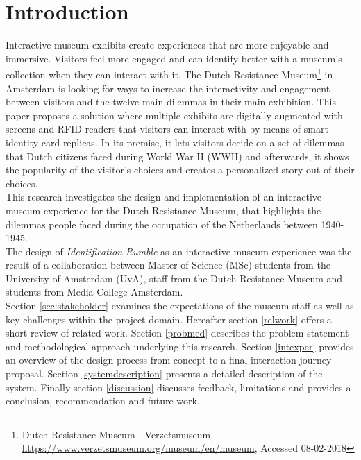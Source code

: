
\section{Introduction}
Interactive museum exhibits create experiences that are more enjoyable and immersive. Visitors feel more engaged and can identify better with a museum's collection when they can interact with it. The Dutch Resistance Museum\footnote{Dutch Resistance Museum - Verzetsmuseum, \url{https://www.verzetsmuseum.org/museum/en/museum}, Accessed 08-02-2018} in Amsterdam is looking for ways to increase the interactivity and engagement between visitors and the twelve main dilemmas in their main exhibition. This paper proposes a solution where multiple exhibits are digitally augmented with screens and RFID readers that visitors can interact with by means of smart identity card replicas. In its premise, it lets visitors decide on a set of dilemmas that Dutch citizens faced during World War II (WWII) and afterwards, it shows the popularity of the visitor's choices and creates a personalized story out of their choices.\\

\noindent This research investigates the design and implementation of an interactive museum experience for the Dutch Resistance Museum, that highlights the dilemmas people faced during the occupation of the Netherlands between 1940-1945.\\

\noindent The design of \textit{Identification Rumble} as an interactive museum experience was the result of a collaboration between Master of Science (MSc) students from the University of Amsterdam (UvA), staff from the Dutch Resistance Museum and students from Media College Amsterdam. \\

\noindent Section \ref{sec:stakeholder} examines the expectations of the museum staff as well as key challenges within the project domain. Hereafter section \ref{relwork} offers a short review of related work. Section \ref{probmed} describes the problem statement and methodological approach underlying this research. Section \ref{intexper} provides an overview of the design process from concept to a final interaction journey proposal. Section \ref{systemdescription} presents a detailed description of the system. Finally section \ref{discussion} discusses feedback, limitations and provides a conclusion, recommendation and future work.


